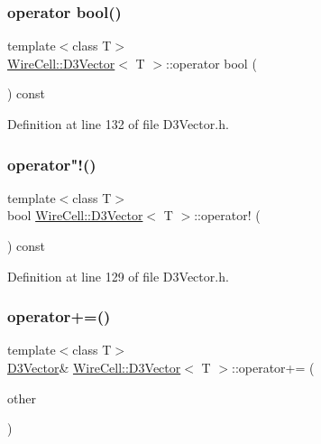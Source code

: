 \subsubsection{\texorpdfstring{operator bool()}{operator bool()}}
{\footnotesize\ttfamily template$<$class T$>$ \\
\hyperlink{class_wire_cell_1_1_d3_vector}{Wire\+Cell\+::\+D3\+Vector}$<$ T $>$\+::operator bool (\begin{DoxyParamCaption}{ }\end{DoxyParamCaption}) const\hspace{0.3cm}{\ttfamily [inline]}}



Definition at line 132 of file D3\+Vector.\+h.

\mbox{\label{class_wire_cell_1_1_d3_vector_a1800f3c26224e1e4d35d81752046c3c3}} 
\subsubsection{\texorpdfstring{operator"!()}{operator!()}}
{\footnotesize\ttfamily template$<$class T$>$ \\
bool \hyperlink{class_wire_cell_1_1_d3_vector}{Wire\+Cell\+::\+D3\+Vector}$<$ T $>$\+::operator! (\begin{DoxyParamCaption}{ }\end{DoxyParamCaption}) const\hspace{0.3cm}{\ttfamily [inline]}}



Definition at line 129 of file D3\+Vector.\+h.

\mbox{\label{class_wire_cell_1_1_d3_vector_a8a235eba65334ae4a2ff5e22bc58b815}} 
\subsubsection{\texorpdfstring{operator+=()}{operator+=()}}
{\footnotesize\ttfamily template$<$class T$>$ \\
\hyperlink{class_wire_cell_1_1_d3_vector}{D3\+Vector}\& \hyperlink{class_wire_cell_1_1_d3_vector}{Wire\+Cell\+::\+D3\+Vector}$<$ T $>$\+::operator+= (\begin{DoxyParamCaption}\item[{const \hyperlink{class_wire_cell_1_1_d3_vector}{D3\+Vector}$<$ T $>$ \&}]{other }\end{DoxyParamCaption})\hspace{0.3cm}{\ttfamily [inline]}}



